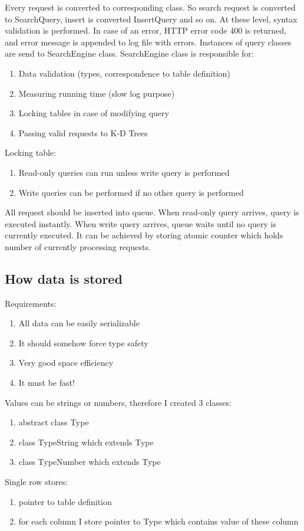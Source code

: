\documentclass[10pt,a4paper]{article}
\begin{document}
Every request is converted to corresponding class. So search request is converted to SearchQuery,
insert is converted InsertQuery and so on. At these level, syntax validation is performed. In case of an
error, HTTP error code 400 is returned, and error message is appended to log file with errors.
Instances of query classes are send to SearchEngine class. SearchEngine class is responsible for:
\begin{enumerate}
\item Data validation (types, correspondence to table definition)
\item Measuring running time (slow log purpose)
\item Locking tables in case of modifying query
\item Passing valid requests to K-D Trees
\end{enumerate}

Locking table:
\begin{enumerate}
\item Read-only queries can run unless write query is performed
\item Write queries can be performed if no other query is performed
\end{enumerate}

All request should be inserted into queue. When read-only query arrives, query is executed instantly. When write query arrives, queue waits until no query is currently executed. It can be achieved by storing atomic counter which holds number of currently processing requests. 

\subsection{How data is stored}
Requirements:
\begin{enumerate}
\item All data can be easily serializable
\item It should somehow force type safety
\item Very good space efficiency
\item It must be fast!
\end{enumerate}
Values can be strings or numbers, therefore I created 3 classes:
\begin{enumerate}
\item abstract class Type
\item class TypeString which extends Type
\item class TypeNumber which extends Type
\end{enumerate}
Single row stores:
\begin{enumerate}
\item pointer to table definition
\item for each column I store pointer to Type which contains value of these column
\end{enumerate}
\end{document}
